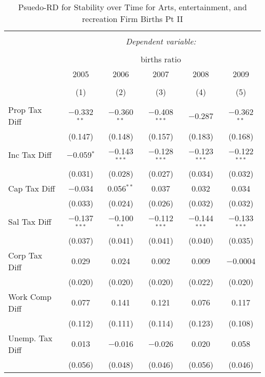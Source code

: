 
\begin{table}[!htbp] \centering 
  \caption{Psuedo-RD for Stability over Time for  Arts, entertainment, and recreation Firm Births Pt II} 
  \label{71year} 
\small 
\begin{tabular}{@{\extracolsep{5pt}}lccccc} 
\\[-1.8ex]\hline 
\hline \\[-1.8ex] 
 & \multicolumn{5}{c}{\textit{Dependent variable:}} \\ 
\cline{2-6} 
\\[-1.8ex] & \multicolumn{5}{c}{births ratio} \\ 
 & 2005 & 2006 & 2007 & 2008 & 2009 \\ 
\\[-1.8ex] & (1) & (2) & (3) & (4) & (5)\\ 
\hline \\[-1.8ex] 
 Prop Tax Diff & $-$0.332$^{**}$ & $-$0.360$^{**}$ & $-$0.408$^{***}$ & $-$0.287 & $-$0.362$^{**}$ \\ 
  & (0.147) & (0.148) & (0.157) & (0.183) & (0.168) \\ 
  Inc Tax Diff & $-$0.059$^{*}$ & $-$0.143$^{***}$ & $-$0.128$^{***}$ & $-$0.123$^{***}$ & $-$0.122$^{***}$ \\ 
  & (0.031) & (0.028) & (0.027) & (0.034) & (0.032) \\ 
  Cap Tax Diff & $-$0.034 & 0.056$^{**}$ & 0.037 & 0.032 & 0.034 \\ 
  & (0.033) & (0.024) & (0.026) & (0.032) & (0.032) \\ 
  Sal Tax Diff & $-$0.137$^{***}$ & $-$0.100$^{**}$ & $-$0.112$^{***}$ & $-$0.144$^{***}$ & $-$0.133$^{***}$ \\ 
  & (0.037) & (0.041) & (0.041) & (0.040) & (0.035) \\ 
  Corp Tax Diff & 0.029 & 0.024 & 0.002 & 0.009 & $-$0.0004 \\ 
  & (0.020) & (0.020) & (0.020) & (0.022) & (0.020) \\ 
  Work Comp Diff & 0.077 & 0.141 & 0.121 & 0.076 & 0.117 \\ 
  & (0.112) & (0.111) & (0.114) & (0.123) & (0.108) \\ 
  Unemp. Tax Diff & 0.013 & $-$0.016 & $-$0.026 & 0.020 & 0.058 \\ 
  & (0.056) & (0.048) & (0.046) & (0.056) & (0.046) \\ 

\end{tabular}
\end{table}
